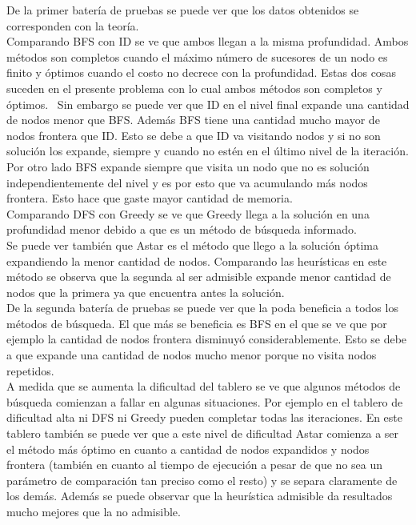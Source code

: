 \documentclass[10pt,journal,compsoc]{IEEEtran}
\begin{document}
De la primer bater\'ia de pruebas se puede ver que los datos obtenidos se corresponden con la teor\'ia.\\
Comparando BFS con ID se ve que ambos llegan a la misma profundidad. Ambos m\'etodos son completos cuando el m\'aximo n\'umero de sucesores de un nodo es finito y \'optimos cuando el costo no decrece con la profundidad. Estas dos cosas suceden en el presente problema con lo cual ambos m\'etodos son completos y \'optimos. \ Sin embargo se puede ver que ID en el nivel final expande una cantidad de nodos menor que BFS. Adem\'as BFS tiene una cantidad mucho mayor de nodos frontera que ID. Esto se debe a que ID va visitando nodos y si no son soluci\'on los expande, siempre y cuando no est\'en en el \'ultimo nivel de la iteraci\'on. Por otro lado BFS expande siempre que visita un nodo que no es soluci\'on independientemente del nivel y es por esto que va acumulando m\'as nodos frontera. Esto hace que gaste mayor cantidad de memoria.\\
Comparando DFS con Greedy se ve que Greedy llega a la soluci\'on en una profundidad menor debido a que es un m\'etodo de b\'usqueda informado.\\
Se puede ver tambi\'en que Astar es el m\'etodo que llego a la soluci\'on \'optima expandiendo la menor cantidad de nodos. Comparando las heur\'isticas en este m\'etodo se observa que la segunda al ser admisible expande menor cantidad de nodos que la primera ya que encuentra antes la soluci\'on.\\

De la segunda bater\'ia de pruebas se puede ver que la poda beneficia a todos los m\'etodos de b\'usqueda. El que m\'as se beneficia es BFS en el que se ve que por ejemplo la cantidad de nodos frontera disminuy\'o considerablemente. Esto se debe a que expande una cantidad de nodos mucho menor porque no visita nodos repetidos.\\
A medida que se aumenta la dificultad del tablero se ve que algunos m\'etodos de b\'usqueda comienzan a fallar en algunas situaciones. Por ejemplo en el tablero de dificultad alta ni DFS ni Greedy pueden completar todas las iteraciones. En este tablero tambi\'en se puede ver que a este nivel de dificultad Astar comienza a ser el m\'etodo m\'as \'optimo en cuanto a cantidad de nodos expandidos y nodos frontera (tambi\'en en cuanto al tiempo de ejecuci\'on a pesar de que no sea un par\'ametro de comparaci\'on tan preciso como el resto) y se separa claramente de los dem\'as. Adem\'as se puede observar que la heur\'istica admisible da resultados mucho mejores que la no admisible.
\end{document}
